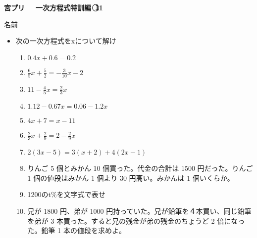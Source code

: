 \documentclass[a4paper,fleqn,papersize,15pt]{jsarticle}
\begin{document}
\clearpage
 \begin{center}
   \LARGE\textbf{宮プリ　~一次方程式特訓編~\textcircled{\scriptsize 11}}
     \begin{flushright}
       名前\underline{\hspace{8zw}}
     \end{flushright}
 \end{center}

 \begin{itemize}
   \item 次の一次方程式をxについて解け
   \begin{enumerate}
\item $0.4x+0.6=0.2$ \begin{flushright}\framebox[8em]{\rule{0pt}{6ex}}\end{flushright} %
\item $\frac{6}{5} x+ \frac{5}{2} =- \frac{3}{10} x-2$ \begin{flushright}\framebox[8em]{\rule{0pt}{6ex}}\end{flushright} %
\item $11- \frac{4}{5} x= \frac{2}{3} x$ \begin{flushright}\framebox[8em]{\rule{0pt}{6ex}}\end{flushright} %
\item $1.12-0.67x=0.06-1.2x$ \begin{flushright}\framebox[8em]{\rule{0pt}{6ex}}\end{flushright} %
\item $4x+7=x-11$ \begin{flushright}\framebox[8em]{\rule{0pt}{6ex}}\end{flushright} %
\item $\frac{2}{3} x+ \frac{2}{9} =2- \frac{2}{9} x$ \begin{flushright}\framebox[8em]{\rule{0pt}{6ex}}\end{flushright} %
\item $2(3x-5)=3(x+2)+4(2x-1)$ \begin{flushright}\framebox[8em]{\rule{0pt}{6ex}}\end{flushright} %
\item りんご 5 個とみかん 10 個買った。代金の合計は 1500 円だった。りんご 1 個の値段はみかん 1 個より 30 円高い。みかんは 1 個いくらか。 \vfill \begin{flushright}\framebox[8em]{\rule{0pt}{6ex}}\end{flushright} %
\item 1200のt\%を文字式で表せ \vfill \begin{flushright}\framebox[8em]{\rule{0pt}{6ex}}\end{flushright} %
\item 兄が 1800 円、弟が 1000 円持っていた。兄が鉛筆を４本買い、同じ鉛筆を弟が 3 本買った。すると兄の残金が弟の残金のちょうど 2 倍になった。鉛筆 1 本の値段を求めよ。 \vfill \begin{flushright}\framebox[8em]{\rule{0pt}{6ex}}\end{flushright} %
\end{enumerate}
    \vfill
\end{itemize}
\end{document}
